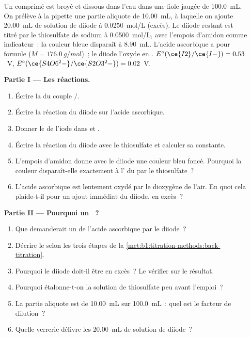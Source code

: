 \begin{problem}
\label{pb:b1:titration-methods:1}
Un comprimé est broyé et dissous dans l'eau dans une fiole jaugée de
\qty{100.0}{mL}. On prélève à la pipette une partie aliquote de
\qty{10.00}{mL}, à laquelle on ajoute \qty{20.00}{mL} de solution de
diiode à \qty{0.0250}{mol/L} (excès). Le diiode restant est titré par
le thiosulfate de sodium à \qty{0.0500}{mol/L}, avec l'empois d'amidon
comme indicateur~: la couleur bleue disparaît à \qty{8.90}{mL}. L'acide
ascorbique a pour formule  ($M = \qty{176.0}{g/mol}$)~; le
diiode l'oxyde en . $E^\circ(\ce{I2}/\ce{I-}) = 0.53$~V,
$E^\circ(\ce{S4O6^2-}/\ce{S2O3^2-}) = 0.02$~V.

\medskip
\noindent\textbf{Partie I --- Les réactions.}
\begin{enumerate}
  \item Écrire la  du couple /.
  \item Écrire la réaction du diiode sur l'acide ascorbique.
  \item Donner le  de l'iode dans  et .
  \item Écrire la réaction du diiode avec le thiosulfate et calculer sa
        constante.
  \item L'empois d'amidon donne avec le diiode une couleur bleu foncé.
        Pourquoi la couleur disparaît-elle exactement à l' du
         par le thiosulfate~?
  \item L'acide ascorbique est lentement oxydé par le dioxygène de
        l'air. En quoi cela plaide-t-il pour un ajout immédiat du diiode,
        en excès~?
\end{enumerate}

\medskip
\noindent\textbf{Partie II --- Pourquoi un ~?}
\begin{enumerate}[resume]
  \item Que demanderait un  de l'acide ascorbique par le
        diiode~?
  \item Décrire le  selon les trois étapes de la
        \cref{met:b1:titration-methods:back-titration}.
  \item Pourquoi le diiode doit-il être en excès~? Le vérifier sur le
        résultat.
  \item Pourquoi étalonne-t-on la solution de thiosulfate peu avant
        l'emploi~?
  \item La partie aliquote est de \qty{10.00}{mL} sur \qty{100.0}{mL}~:
        quel est le facteur de dilution~?
  \item Quelle verrerie délivre les \qty{20.00}{mL} de solution de
        diiode~?
\end{enumerate}


\end{problem}
